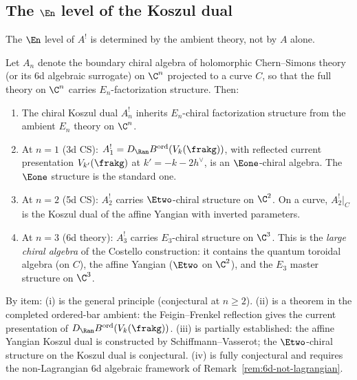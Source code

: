 \subsection{The \texorpdfstring{$\En$}{E-n} level of the Koszul dual}
\label{subsec:en-koszul-level}

The $\En$ level of $A^!$ is determined by the ambient theory, not by $A$ alone.

\begin{conjecture}
\label{conj:en-koszul-from-hcs}
\ClaimStatusConjectured
Let $A_n$ denote the boundary chiral algebra of holomorphic Chern--Simons theory (or its 6d algebraic surrogate) on $\C^n$ projected to a curve $C$, so that the full theory on $\C^n$ carries $E_n$-factorization structure. Then:
\begin{enumerate}[label=\textup{(\roman*)}]
 \item The chiral Koszul dual $A_n^!$ inherits $E_n$-chiral factorization structure from the ambient $E_n$ theory on $\C^n$.
 \item At $n = 1$ (3d CS): $A_1^! = D_{\Ran}B^{\mathrm{ord}}(V_k(\frakg))$, with reflected current presentation $V_{k'}(\frakg)$ at $k' = -k - 2h^\vee$, is an $\Eone$-chiral algebra. The $\Eone$ structure is the standard one.
 \item At $n = 2$ (5d CS): $A_2^!$ carries $\Etwo$-chiral structure on $\C^2$. On a curve, $A_2^!|_C$ is the Koszul dual of the affine Yangian with inverted parameters.
 \item At $n = 3$ (6d theory): $A_3^!$ carries $E_3$-chiral structure on $\C^3$. This is the \emph{large chiral algebra} of the Costello construction: it contains the quantum toroidal algebra (on $C$), the affine Yangian ($\Etwo$ on $\C^2$), and the $E_3$ master structure on $\C^3$.
\end{enumerate}
By item: (i) is the general principle (conjectural at $n \geq 2$). (ii) is a theorem in the completed ordered-bar ambient: the Feigin--Frenkel reflection gives the current presentation of $D_{\Ran}B^{\mathrm{ord}}(V_k(\frakg))$. (iii) is partially established: the affine Yangian Koszul dual is constructed by Schiffmann--Vasserot; the $\Etwo$-chiral structure on the Koszul dual is conjectural. (iv) is fully conjectural and requires the non-Lagrangian 6d algebraic framework of Remark~\ref{rem:6d-not-lagrangian}.
\end{conjecture}

